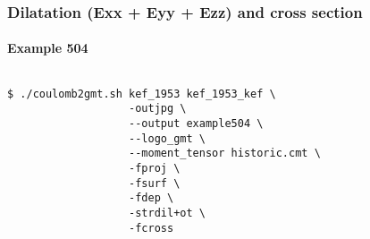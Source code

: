 \begin{frame}[t,fragile]
  \frametitle{Dilatation (Exx + Eyy + Ezz) and cross section}
  \framesubtitle{Example 504}
  \label{ch5fr:ex504}
\begin{columns}[t]
  \begin{column}{.5\textwidth}
\begin{scriptsize}
\begin{verbatim}
$ ./coulomb2gmt.sh kef_1953 kef_1953_kef \
                   -outjpg \ 
                   --output example504 \
                   --logo_gmt \
                   --moment_tensor historic.cmt \
                   -fproj \
                   -fsurf \
                   -fdep \
                   -strdil+ot \
                   -fcross
\end{verbatim}
\end{scriptsize}

  \end{column}
  \begin{column}{.5\textwidth}

\centering
  \end{column}
\end{columns}

\end{frame}
\note{}




















